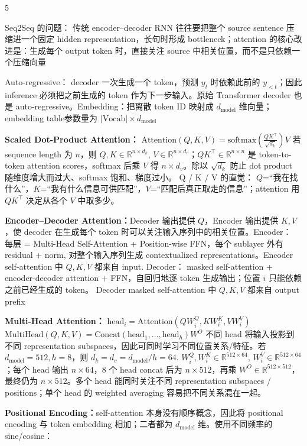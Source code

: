 \documentclass[a4paper, landscape]{article}
\begin{document}
\begin{multicols}{5}
\par Seq2Seq 的问题： 传统 encoder–decoder RNN 往往要把整个 source sentence 压缩进一个固定 hidden representation，长句时形成 bottleneck；attention 的核心改进是：生成每个 output token 时，直接关注 source 中相关位置，而不是只依赖一个压缩向量
\par Auto-regressive： decoder 一次生成一个 token，预测 \(y_t\) 时依赖此前的 \(y_{<t}\)；因此 inference 必须把之前生成的 token 作为下一步输入。原始 Transformer decoder 也是 auto-regressive。Embedding：把离散 token ID 映射成 \(d_{\text{model}}\) 维向量；embedding table参数量为
\(
|\text{Vocab}|\times d_{\text{model}}
\)
\par \textbf{Scaled Dot-Product Attention：}
\(
\mathrm{Attention}(Q,K,V)=
\mathrm{softmax}\left(\frac{QK^\top}{\sqrt{d_k}}\right)V
\)
若 sequence length 为 \(n\)，则 \(Q,K\in\mathbb R^{n\times d_k}\), \(V\in\mathbb R^{n\times d_v}\)；\(QK^\top\in\mathbb R^{n\times n}\) 是 token-to-token attention scores，softmax 后乘 \(V\) 得 \(n\times d_v\)。除以 \(\sqrt{d_k}\) 防止 dot product 随维度增大而过大、softmax 饱和、梯度过小。    
Q / K / V 的直觉： \(Q\)=“我在找什么”，\(K\)=“我有什么信息可供匹配”，\(V\)=“匹配后真正取走的信息”；attention 用 \(QK^\top\) 决定从各个 \(V\) 中取多少。
\par \textbf{Encoder–Decoder Attention：}Decoder 输出提供 \(Q\)，Encoder 输出提供 \(K,V\)，使 decoder 在生成每个 token 时可以关注输入序列中的相关位置。Encoder： 每层 = Multi-Head Self-Attention + Position-wise FFN，每个 sublayer 外有 residual + norm, 对整个输入序列生成 contextualized representations。Encoder self-attention 中 \(Q,K,V\) 都来自 input. Decoder： masked self-attention + encoder-decoder attention + FFN，自回归地逐 token 生成输出；位置 \(i\) 只能依赖之前已经生成的 token。 Decoder masked self-attention 中 \(Q,K,V\) 都来自 output prefix
\par \textbf{Multi-Head Attention：}
\(
\mathrm{head}_i=\mathrm{Attention}(QW_i^Q,KW_i^K,VW_i^V)
\)
\(\mathrm{MultiHead}(Q,K,V)=\mathrm{Concat}(\mathrm{head}_1,\ldots,\mathrm{head}_h)W^O
\)
不同 head 将输入投影到不同 representation subspaces，因此可同时学习不同位置关系/特征。若 \(d_{\text{model}}=512,h=8\)，则
\(
d_k=d_v=d_{\text{model}}/h=64.
\)
\(W_i^Q,W_i^K\in\mathbb R^{512\times64}\), \(W_i^V\in\mathbb R^{512\times64}\)；每个 head 输出 \(n\times64\)，8 个 head concat 后为 \(n\times512\)，再乘 \(W^O\in\mathbb R^{512\times512}\)，最终仍为 \(n\times512\)。多个 head 能同时关注不同 representation subspaces / positions；单个 head 的 weighted averaging 容易把不同关系混在一起。
\par \textbf{Positional Encoding：}self-attention 本身没有顺序概念，因此将 positional encoding 与 token embedding 相加；二者都为 \(d_{\text{model}}\) 维。使用不同频率的 sine/cosine：

\end{multicols}
\end{document}
